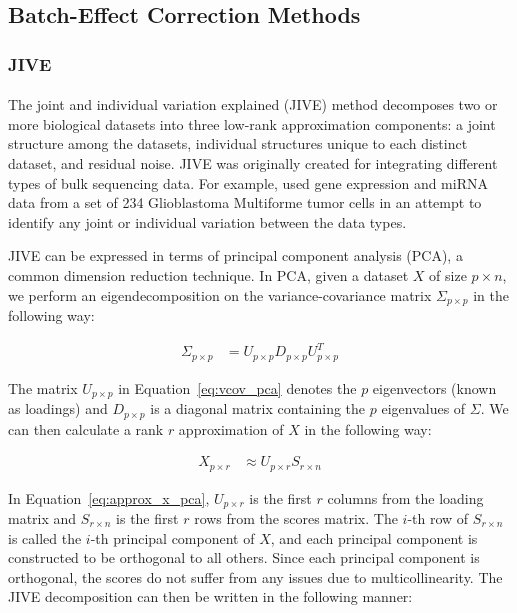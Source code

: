 \documentclass[
12pt, %
letterpaper, %
oneside, %
headinclude,footinclude, %
BCOR5mm, %
]{scrartcl}
\begin{document}

\subsection{Batch-Effect Correction Methods}

\subsubsection*{JIVE}

\paragraph*{}
The joint and individual variation explained (JIVE) method \citep{lock2013joint} decomposes two or more biological datasets into three low-rank approximation components: a joint structure among the datasets, individual structures unique to each distinct dataset, and residual noise. JIVE was originally created for integrating different types of bulk sequencing data. For example, \citet{lock2013joint} used gene expression and miRNA data from a set of 234 Glioblastoma Multiforme tumor cells in an attempt to identify any joint or individual variation between the data types. 

JIVE can be expressed in terms of principal component analysis (PCA), a common dimension reduction technique. In PCA, given a dataset $X$ of size $p \times n$, we perform an eigendecomposition on the variance-covariance matrix $\Sigma_{p \times p}$ in the following way:

\begin{align}
    \Sigma_{p \times p} &= U_{p \times p} D_{p \times p} U_{p \times p}^T
    \label{eq:vcov_pca}
\end{align}

The matrix $U_{p \times p}$ in Equation~\ref{eq:vcov_pca} denotes the $p$ eigenvectors (known as loadings) and $D_{p \times p}$ is a diagonal matrix containing the $p$ eigenvalues of $\Sigma$. We can then calculate a rank $r$ approximation of $X$ in the following way:

\begin{align}
    X_{p \times r} &\approx U_{p \times r} S_{r \times n}
    \label{eq:approx_x_pca}
\end{align}

In Equation~\ref{eq:approx_x_pca}, $U_{p \times r}$ is the first $r$ columns from the loading matrix and $S_{r \times n}$ is the first $r$ rows from the scores matrix. The $i$-th row of $S_{r \times n}$ is called the $i$-th principal component of $X$, and each principal component is constructed to be orthogonal to all others. Since each principal component is orthogonal, the scores do not suffer from any issues due to multicollinearity. The JIVE decomposition can then be written in the following manner:
\end{document}
